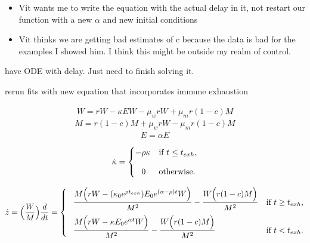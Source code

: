 \documentclass[letterpaper,index=totoc,hyperref,openany]{labbook} %
\newcommand{\researcher}{\subsubsection}
\begin{document}
\researcher{}
\begin{description}
  \item[Project State:]
    \begin{itemize}
    
    \item{Vit wants me to write the equation with the actual delay in it, not restart our function with a new $\alpha$ and new initial conditions}
    
    \item{Vit thinks we are getting bad estimates of c because the data is bad for the examples I showed him. I think this might be outside my realm of control.}
    \end{itemize}
  \item[Current Tasks:]
  \item{have ODE with delay. Just need to finish solving it.}
  \item[Future Tasks:] {rerun fits with new equation that incorporates immune exhaustion}
  \end{description}
  
  
  $$\dot W=  rW- \kappa E W -\mu_w rW + \mu_m r(1-c)M $$
$$\dot M = r(1-c)M  +\mu_w rW -\mu_m r(1-c)M $$
$$\dot E =\alpha E$$




$$\dot \kappa=
\begin{cases}
 -\rho \kappa   &\text{if $t \leq t_{exh}$},\\[2ex]
\hphantom{-}  0  &\text{otherwise}.
\end{cases}$$
  
  $$\dot{z}=\Big( \dfrac{W}{M} \Big)\dfrac{d}{dt} =
\begin{cases}
\hphantom{-} \dfrac{M \Big( rW- (\kappa_0 e^{\rho  t_{exh}})  E_0 e^{(\alpha -\rho) t}  W \Big)}{M^2}-\dfrac{ W \Big(r(1-c)M \Big)}{M^2} &\text{if $t \geq t_{exh}$},\\[2ex]
\hphantom{-} \dfrac{M \Big( rW- \kappa E_0 e^{\alpha t} W \Big)}{M^2}-\dfrac{ W \Big(r(1-c)M \Big)}{M^2}  &\text{if $t < t_{exh}$}.
\end{cases}$$
\end{document}
